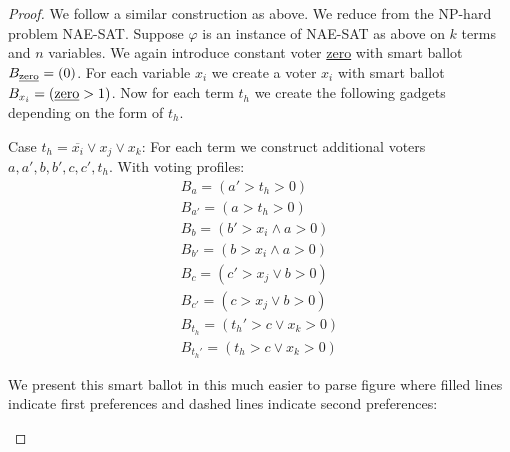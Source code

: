 \documentclass[11pt,a4paper, titlepage]{article}
\theoremstyle{definition}
\begin{document}
\begin{proof}
    We follow a similar construction as above. We reduce from the NP-hard problem \textsc{NAE-SAT}. Suppose $\varphi$ is an instance of \textsc{NAE-SAT} as above on $k$ terms and $n$ variables. We again introduce constant voter \underline{zero} with smart ballot $B_{\text{\underline{zero}}} = (0)$. For each variable $x_i$ we create a voter $x_i$ with smart ballot $B_{x_i} = (\text{\underline{zero}} > 1)$. Now for each term $t_h$ we create the following gadgets depending on the form of $t_h$.

    Case $t_h = \overline{x_i} \lor x_j \lor x_k$:
    For each term we construct additional voters $a, a', b, b', c, c', t_h$. With voting profiles: 
    \begin{align*}
        B_a = (a' > t_h > 0) \\
        B_{a'} = (a > t_h > 0) \\
        B_{b} = (b' > x_i \land a > 0) \\
        B_{b'} = (b > x_i \land a > 0) \\
        B_{c} = (c' > x_j \lor b > 0) \\
        B_{c'} = (c > x_j \lor b > 0) \\
        B_{t_h} = (t_h' > c \lor x_k > 0) \\
        B_{t_h'} = (t_h > c \lor x_k > 0)
    \end{align*}

    We present this smart ballot in this much easier to parse figure where filled lines indicate first preferences and dashed lines indicate second preferences:
    \begin{figure}[h]
        \centering

\end{figure}
\end{proof}
\end{document}
